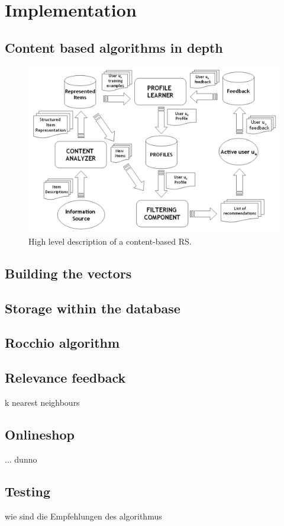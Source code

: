 

\section{Implementation}

\subsection{Content based algorithms in depth}
\label{sec:implementation-contentbased}
\begin{figure}[h]
    \includegraphics[scale=0.3]{inc/rocchio/HighlevelContentBased}
    \caption{High level description of a content-based RS.\citep[p.~76]{lops:2011}}
\end{figure}

\subsection{Building the vectors}

\subsection{Storage within the database}

\subsection{Rocchio algorithm}

\subsection{Relevance feedback}

k nearest neighbours

\subsection{Onlineshop}
... dunno

\subsection{Testing}
wie sind die Empfehlungen des algorithmus
